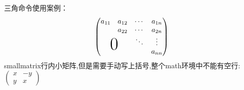 \documentclass{ctexart}
\begin{document}
    三角命令使用案例：
    \[
      \begin{pmatrix}
          a_{11} & a_{12} & \cdots &a_{1n} \\
                 & a_{22} & \cdots & a_{2n} \\
                 &        & \ddots & \vdots \\
        \multicolumn{2}{c}{\raisebox{1.3ex}[0pt]{\Huge 0}} &    &a_{nn}
      \end{pmatrix}  
    \]
    smallmatrix行内小矩阵,但是需要手动写上括号,整个math环境中不能有空行:
      \begin{math}
        \left(
            \begin{smallmatrix}
                x&-y \\
                y&x
            \end{smallmatrix}
        \right)
      \end{math}
      
      
\end{document}
